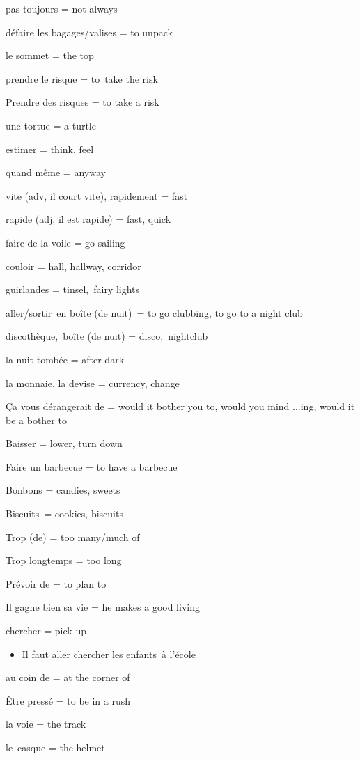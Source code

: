 {pas toujours = not always}

{défaire les bagages/valises = to unpack}{~}

{le sommet = the top}

{prendre le risque = to~}{take the risk}

{Prendre des risques = to take a risk}

{une tortue = a turtle}

{estimer = think, feel}

{quand même = anyway}

{vite (adv, il court vite), rapidement = fast}

{rapide (adj, il est rapide) = fast, quick}

{faire de la voile = go sailing}

{couloir = hall, hallway, corridor}

{guirlandes = tinsel,~}{fairy lights}

{aller/sortir~en boîte (de nuit)~= to go clubbing, to go to a night
club}

{discothèque,~}{boîte (de nuit)} {= disco,~nightclub}

{la nuit tombée = after dark}

{la monnaie, la devise = currency, change}

{Ça vous dérangerait de = would it bother you to, would you mind ...ing,
would it be a bother to}

{Baisser = lower, turn down~}

{Faire un barbecue = to have a barbecue}

{Bonbons = candies, sweets}

{Biscuits~= cookies, biscuits~}

{Trop (de) = too many/much of}

{Trop longtemps = too long}

{Prévoir de = to plan to}

{Il gagne bien sa vie = he makes a good living~}

{chercher = pick up}

\begin{itemize}
\item
  {Il faut aller chercher les enfants~}{à l'école}
\end{itemize}

{au coin de = at the corner of}

{Être pressé = to be in a rush}

{la voie = the track}

{le~}{casque = the helmet}

